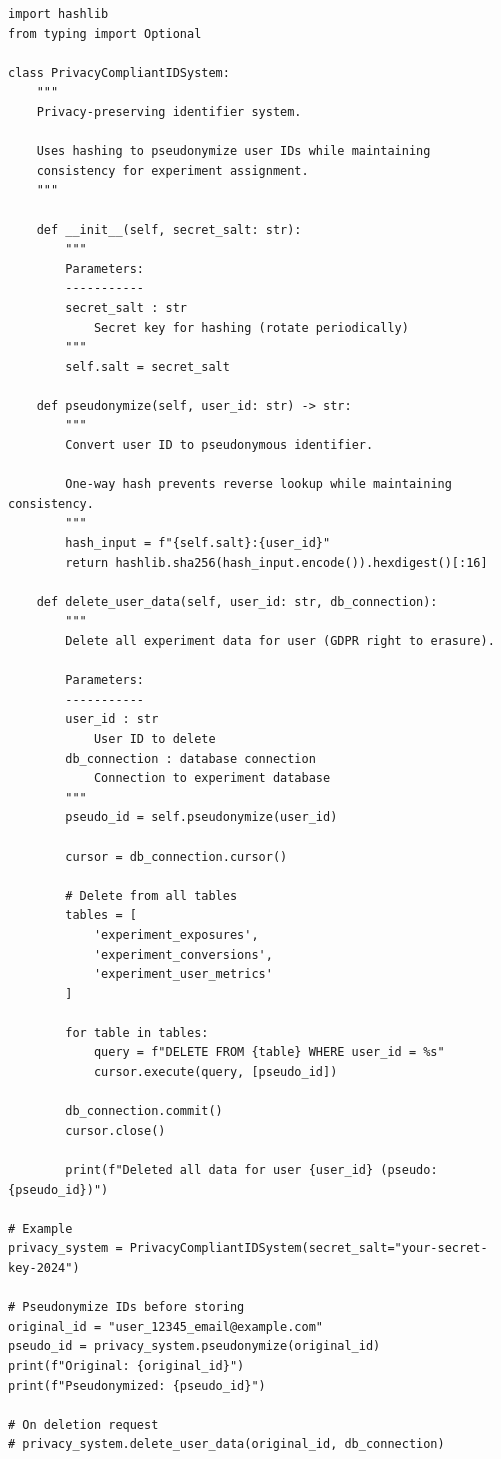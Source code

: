 \lstset{language=Python, caption=Privacy-Preserving Data Handling}
\begin{lstlisting}
import hashlib
from typing import Optional

class PrivacyCompliantIDSystem:
    """
    Privacy-preserving identifier system.

    Uses hashing to pseudonymize user IDs while maintaining
    consistency for experiment assignment.
    """

    def __init__(self, secret_salt: str):
        """
        Parameters:
        -----------
        secret_salt : str
            Secret key for hashing (rotate periodically)
        """
        self.salt = secret_salt

    def pseudonymize(self, user_id: str) -> str:
        """
        Convert user ID to pseudonymous identifier.

        One-way hash prevents reverse lookup while maintaining consistency.
        """
        hash_input = f"{self.salt}:{user_id}"
        return hashlib.sha256(hash_input.encode()).hexdigest()[:16]

    def delete_user_data(self, user_id: str, db_connection):
        """
        Delete all experiment data for user (GDPR right to erasure).

        Parameters:
        -----------
        user_id : str
            User ID to delete
        db_connection : database connection
            Connection to experiment database
        """
        pseudo_id = self.pseudonymize(user_id)

        cursor = db_connection.cursor()

        # Delete from all tables
        tables = [
            'experiment_exposures',
            'experiment_conversions',
            'experiment_user_metrics'
        ]

        for table in tables:
            query = f"DELETE FROM {table} WHERE user_id = %s"
            cursor.execute(query, [pseudo_id])

        db_connection.commit()
        cursor.close()

        print(f"Deleted all data for user {user_id} (pseudo: {pseudo_id})")

# Example
privacy_system = PrivacyCompliantIDSystem(secret_salt="your-secret-key-2024")

# Pseudonymize IDs before storing
original_id = "user_12345_email@example.com"
pseudo_id = privacy_system.pseudonymize(original_id)
print(f"Original: {original_id}")
print(f"Pseudonymized: {pseudo_id}")

# On deletion request
# privacy_system.delete_user_data(original_id, db_connection)
\end{lstlisting}

